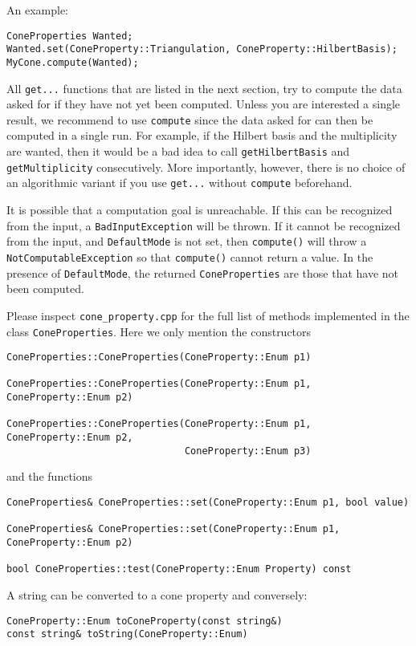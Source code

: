 \documentclass[12pt,a4paper]{scrartcl}
\theoremstyle{definition}
\begin{document}
\begin{small}
An example:
\begin{Verbatim}
ConeProperties Wanted;
Wanted.set(ConeProperty::Triangulation, ConeProperty::HilbertBasis);
MyCone.compute(Wanted);
\end{Verbatim}

All \verb|get...| functions that are listed in the next section, try to compute the data asked for if they have not yet been computed. Unless you are interested a single result, we recommend to use \verb|compute| since the data asked for can then be computed in a single run. For example, if the Hilbert basis and the multiplicity are wanted, then it would be a bad idea to call \verb|getHilbertBasis| and \verb|getMultiplicity| consecutively. More importantly, however, there is no choice of an algorithmic variant if you use \verb|get...| without \verb|compute| beforehand.

It is possible that a computation goal is unreachable. If this can be recognized from the input, a \verb|BadInputException| will be thrown. If it cannot be recognized from the input, and \verb|DefaultMode| is not set, then \verb|compute()| will throw a \verb|NotComputableException| so that \verb|compute()| cannot return a value. In the presence of \verb|DefaultMode|, the returned \verb|ConeProperties| are those that have not been computed.

Please inspect \verb|cone_property.cpp| for the full list of methods implemented in the class \verb|ConeProperties|. Here we only mention the constructors
\begin{Verbatim}
ConeProperties::ConeProperties(ConeProperty::Enum p1)

ConeProperties::ConeProperties(ConeProperty::Enum p1, ConeProperty::Enum p2)

ConeProperties::ConeProperties(ConeProperty::Enum p1, ConeProperty::Enum p2,
                               ConeProperty::Enum p3)
\end{Verbatim}
and the functions
\begin{Verbatim}
ConeProperties& ConeProperties::set(ConeProperty::Enum p1, bool value)

ConeProperties& ConeProperties::set(ConeProperty::Enum p1, ConeProperty::Enum p2)

bool ConeProperties::test(ConeProperty::Enum Property) const
\end{Verbatim}

A string can be converted to a cone property and conversely:
\begin{Verbatim}
ConeProperty::Enum toConeProperty(const string&)
const string& toString(ConeProperty::Enum)
\end{Verbatim}


\end{small}
\end{document}
